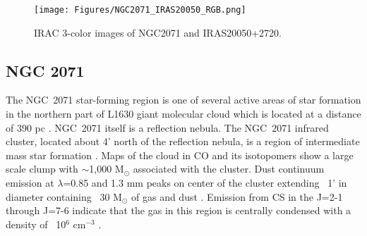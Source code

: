 \begin{landscape}
\begin{figure}
\begin{center}
\texttt{[image: Figures/NGC2071\_IRAS20050\_RGB.png]}
\label{fig:NGC2071_IRAS20050_RGB}
\caption[NGC2071 and IRAS20050+2720]{IRAC 3-color images of NGC2071 and IRAS20050+2720. 
}
\end{center}
\end{figure}
\end{landscape}

\subsection{NGC 2071}
The NGC~2071 star-forming region is one of several active areas of star formation in the northern part of L1630 giant molecular cloud which is located at a distance of 390 pc \citep{A-T1982}. 
NGC~2071 itself is a reflection nebula.
The NGC~2071 infrared cluster, located about 4' north of the reflection nebula, is a region of intermediate mass star formation \citep{Strom1976, Persson1981, Butner1990}. Maps of the cloud in CO and its isotopomers \citep{Buckle2010} show a large scale clump with $\sim$1,000 M$_\odot$ associated with the cluster. Dust continuum emission at $\lambda$=0.85 and 1.3 mm peaks on center of the cluster extending ~1' in diameter containing ~30 M$_\odot$ of gas and dust \citep{Johnstone2001,Mitchell2001,Launhardt1996}. Emission from CS in the J=2-1 through J=7-6 indicate that the gas in this region is centrally condensed with a density of ~10$^6$ cm$^{-3}$ \citep{Zhou1990}. 


